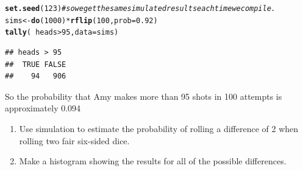 \documentclass[twoside]{book}\usepackage[]{graphicx}\usepackage[]{xcolor}
\makeatletter
\newcommand{\hlnum}[1]{\textcolor[rgb]{0.686,0.059,0.569}{#1}}%
\newcommand{\hlcom}[1]{\textcolor[rgb]{0.678,0.584,0.686}{\textit{#1}}}%
\newcommand{\hlopt}[1]{\textcolor[rgb]{0,0,0}{#1}}%
\newcommand{\hlstd}[1]{\textcolor[rgb]{0.345,0.345,0.345}{#1}}%
\newcommand{\hlkwb}[1]{\textcolor[rgb]{0.69,0.353,0.396}{#1}}%
\newcommand{\hlkwc}[1]{\textcolor[rgb]{0.333,0.667,0.333}{#1}}%
\newcommand{\hlkwd}[1]{\textcolor[rgb]{0.737,0.353,0.396}{\textbf{#1}}}%
\newenvironment{kframe}{%
 \def\at@end@of@kframe{}%
 \ifinner\ifhmode%
  \def\at@end@of@kframe{\end{minipage}}%
  \begin{minipage}{\columnwidth}%
 \fi\fi%
 \def\FrameCommand##1{\hskip\@totalleftmargin \hskip-\fboxsep
 \colorbox{shadecolor}{##1}\hskip-\fboxsep
     \hskip-\linewidth \hskip-\@totalleftmargin \hskip\columnwidth}%
 \MakeFramed {\advance\hsize-\width
   \@totalleftmargin\z@ \linewidth\hsize
   \@setminipage}}%
 {\par\unskip\endMakeFramed%
 \at@end@of@kframe}
\newenvironment{knitrout}{}{} %
\makeatother
\begin{document}
\begin{solution}
\begin{knitrout}
\color{fgcolor}\begin{kframe}
\begin{alltt}
\hlkwd{set.seed}\hlstd{(}\hlnum{123}\hlstd{)}    \hlcom{# so we get the same simulated results each time we compile.}
\hlstd{sims} \hlkwb{<-} \hlkwd{do}\hlstd{(}\hlnum{1000}\hlstd{)} \hlopt{*} \hlkwd{rflip}\hlstd{(}\hlnum{100}\hlstd{,} \hlkwc{prob}\hlstd{=}\hlnum{0.92}\hlstd{)}
\hlkwd{tally}\hlstd{(} \hlopt{~} \hlstd{heads} \hlopt{>} \hlnum{95}\hlstd{,} \hlkwc{data}\hlstd{=sims)}
\end{alltt}
\begin{verbatim}
## heads > 95
##  TRUE FALSE 
##    94   906
\end{verbatim}
\end{kframe}
\end{knitrout}
So the probability that Amy makes more than 95 shots in 100 attempts is approximately
0.094
\end{solution}

\begin{problem}
	\begin{enumerate}
		\item
	Use simulation to estimate the probability of rolling a difference of 2 when rolling
	two fair six-sided dice.
\item
	Make a histogram showing the results for all of the possible differences.
	\end{enumerate}

\end{problem}
\end{document}
